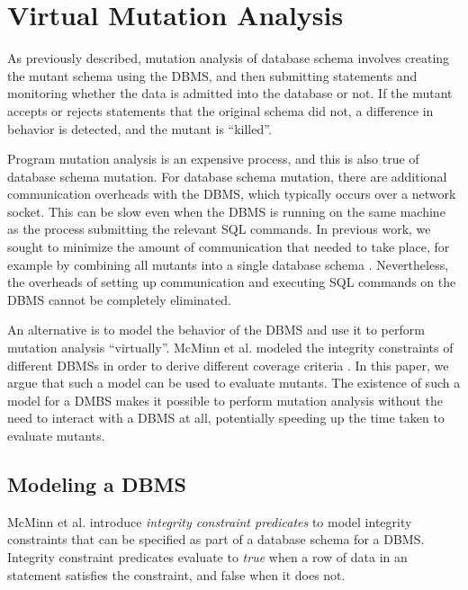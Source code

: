 
\section{Virtual Mutation Analysis}
\label{sec:virtual-mutation-analysis}

As previously described, mutation analysis of database schema involves creating the mutant schema using the DBMS, and then submitting \INSERT statements and monitoring whether the data is admitted into the database or not. If the mutant accepts or rejects \INSERT statements that the original schema did not, a difference in behavior is detected, and the mutant is ``killed''.

Program mutation analysis is an expensive process, and this is also true of database schema mutation. For database schema mutation, there are additional communication overheads with the DBMS, which typically occurs over a network socket. This can be slow even when the DBMS is running on the same machine as the process submitting the relevant SQL commands. 
In previous work, we sought to minimize the amount of communication that needed to take place, for example by combining all mutants into a single database schema \cite{Wright2013}. 
Nevertheless, the overheads of setting up communication and executing SQL commands on the DBMS cannot be completely eliminated.

An alternative is to model the behavior of the DBMS and use it to perform mutation analysis ``virtually''. McMinn et al. modeled the integrity constraints of different DBMSs in order to derive different coverage criteria \cite{McMinn2015}. In this paper, we argue that such a model can be used to evaluate mutants. The existence of such a model for a DMBS makes it possible to perform mutation analysis without the need to interact with a DBMS at all, potentially speeding up the time taken to evaluate mutants.

\subsection{Modeling a DBMS}
McMinn et al. introduce {\it integrity constraint predicates} to model integrity constraints that can be specified as part of a database schema for a DBMS. Integrity constraint predicates evaluate to {\it true} when a row of data in an \INSERT statement satisfies the constraint, and false when it does not.

